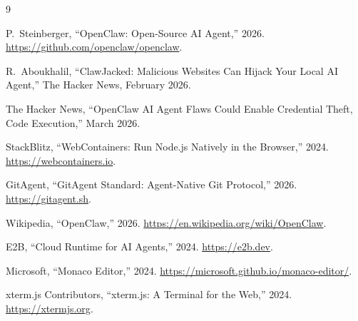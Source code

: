 \documentclass[11pt,twocolumn]{article}
\begin{document}
\begin{thebibliography}{9}

P.~Steinberger, ``OpenClaw: Open-Source AI Agent,'' 2026.
\url{https://github.com/openclaw/openclaw}.

R.~Aboukhalil, ``ClawJacked: Malicious Websites Can Hijack Your Local AI Agent,'' The Hacker News, February 2026.

The Hacker News, ``OpenClaw AI Agent Flaws Could Enable Credential Theft, Code Execution,'' March 2026.

StackBlitz, ``WebContainers: Run Node.js Natively in the Browser,'' 2024.
\url{https://webcontainers.io}.

GitAgent, ``GitAgent Standard: Agent-Native Git Protocol,'' 2026.
\url{https://gitagent.sh}.

Wikipedia, ``OpenClaw,'' 2026.
\url{https://en.wikipedia.org/wiki/OpenClaw}.

E2B, ``Cloud Runtime for AI Agents,'' 2024.
\url{https://e2b.dev}.

Microsoft, ``Monaco Editor,'' 2024.
\url{https://microsoft.github.io/monaco-editor/}.

xterm.js Contributors, ``xterm.js: A Terminal for the Web,'' 2024.
\url{https://xtermjs.org}.

\end{thebibliography}
\end{document}
